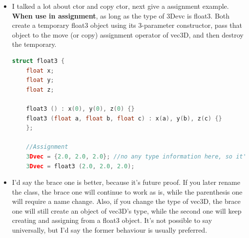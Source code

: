 \documentclass[a4paper,12pt,twoside]{book}
\begin{document}
\begin{itemize}
\begin{enumerate}
\begin{lstlisting}[frame=single, language=c++,mathescape=true]
		auto w = TestOverload{2} //test for (i)
		1) you can use auto w = TestOverload(2), it just call ctor, and w is not const reference.
		2) {} is better, it more generic and avoid narrow auto w = TestOverload{1.2} fail, but auto w = TestOverload(1.2) succeed. 
		3) even ctor is explict, it can work too.
		4) don't call copy ctor at all
		\end{lstlisting}
		
		\begin{lstlisting}[frame=single, language=c++]
		class A{
		public:
		A(){};
		explicit A(int k):m_a(k){};
		explicit A(const A& rhs){m_a = rhs.m_a;};
		virtual ~A(){};
		int m_a;
		};
		
		int main(){
		A a={110};// will compile error
		A a{110} //this will work here.
		A b = {a}; // will compile error.
		//because there are explicit before.
		}
		\end{lstlisting}
		
		\item summary, (h) and (i) is the best way. stick to them when you write the problem in the future. 
	\end{enumerate}
	
	\item I talked a lot about ctor and copy ctor, next give a assignment example. \textbf{When use in assignment}, as long as the type of 3Devc is float3. Both create a temporary float3 object using its 3-parameter constructor, pass that object to the move (or copy) assignment operator of vec3D, and then destroy the temporary. 
	
	\begin{lstlisting}[frame=single, language=c++]
	struct float3 {
	float x; 
	float y;
	float z;
	
	float3 () : x(0), y(0), z(0) {}
	float3 (float a, float b, float c) : x(a), y(b), z(c) {}
	};
	
	//Assignment
	3Dvec = {2.0, 2.0, 2.0}; //no any type information here, so it's better
	3Dvec = float3 (2.0, 2.0, 2.0);
	\end{lstlisting}
	
	
	\item I'd say the brace one is better, because it's future proof. If you later rename the class, the brace one will continue to work as is, while the parenthesis one will require a name change. Also, if you change the type of vec3D, the brace one will still create an object of vec3D's type, while the second one will keep creating and assigning from a float3 object. It's not possible to say universally, but I'd say the former behaviour is usually preferred. 
	

\end{itemize}
\end{document}
